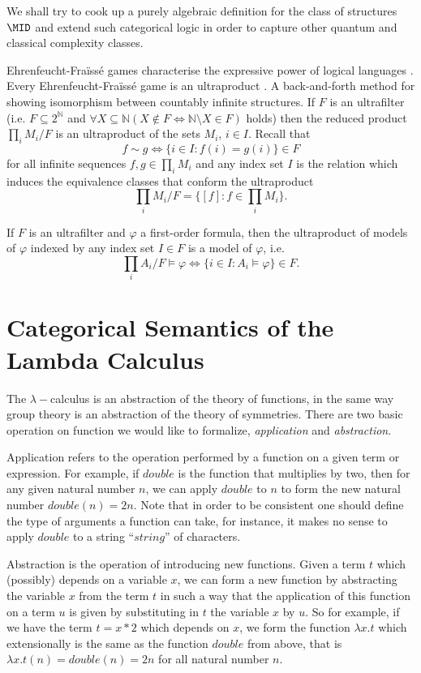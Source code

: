 We shall try to cook up a purely algebraic definition for the class of structures $\MID$ and extend such categorical logic in order to capture other quantum and classical complexity classes. 

Ehrenfeucht-Fra\"iss\'e games characterise the expressive power of logical languages \cite{ams}. Every Ehrenfeucht-Fra\"iss\'e game is an ultraproduct \cite{models}. A back-and-forth method for showing isomorphism between countably infinite structures. If $F$ is an ultrafilter (i.e. $F\subseteq 2^{\mathbb{N}}$ and $\forall X\subseteq\mathbb{N} (X\notin F \Leftrightarrow \mathbb{N}\setminus X\in F)$ holds) then the reduced product $\prod_{i}M_i / F$ is an ultraproduct of the sets $M_i$, $i\in I$. Recall that \[f\sim g \Leftrightarrow \{i\in I : f(i) = g(i)\}\in F\] for all infinite sequences $f,g\in\prod_i M_i$ and any index set $I$ is the relation which induces the equivalence classes that conform the ultraproduct \[\prod_{i}M_i / F = \{[f]:f\in\prod_i M_i\}.\] 

\begin{lem}
If $F$ is an ultrafilter and $\varphi$ a first-order formula, then the ultraproduct of models of $\varphi$ indexed by any index set $I\in F$ is a model of $\varphi$, i.e. \[\prod_i A_i / F \models\varphi\Leftrightarrow\{i\in I: A_i\models\varphi\}\in F.\]
\end{lem}

\section{Categorical Semantics of the Lambda Calculus}


The $\lambda-$calculus is an abstraction of the theory of functions,
in the same way group theory is an abstraction of the theory of
symmetries. There are two basic operation on function we would like to
formalize, \emph{application} and \emph{abstraction}.

Application refers to the operation performed by a function on a given
term or expression. For example, if $double$ is the function that
multiplies by two, then for any given natural number $n$, we can apply
$double$ to $n$ to form the new natural number $double(n) = 2n$. Note
that in order to be consistent one should define the type of
arguments a function can take, for instance, it makes no sense to
apply $double$ to a string ``$string$'' of characters. 

Abstraction is the operation of introducing new functions. Given a
term $t$ which (possibly) depends on a variable $x$, we can form a
new function by abstracting the variable $x$ from the term $t$ in such a
way that the application of this function on a term $u$ is given by
substituting in $t$ the variable $x$ by $u$. So for example, if we
have the term $t = x * 2$ which depends on $x$, we form the function
$\lambda x.t$ which extensionally is the same as the function $double$
from above, that is $\lambda x.t(n) = double(n) = 2n$ for all natural
number $n$.

